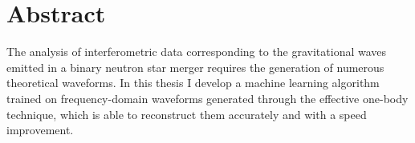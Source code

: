 \documentclass[main.tex]{subfiles}
\begin{document}








\vspace*{\fill}
\section*{Abstract}
The analysis of interferometric data corresponding to the gravitational waves emitted in a binary neutron star merger requires the generation of numerous theoretical waveforms.
In this thesis I develop a machine learning algorithm trained on frequency-domain waveforms generated through the effective one-body technique, which is able to reconstruct them accurately and with a speed improvement.
\vspace*{\fill}

\newpage

\tableofcontents



\end{document}
